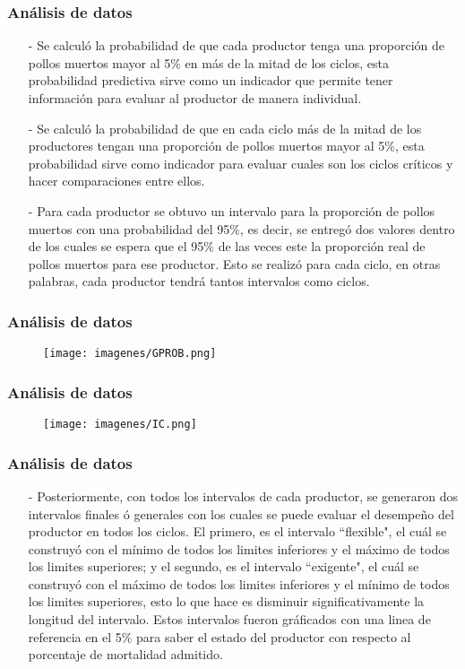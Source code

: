 \documentclass[11pt]{beamer}
\begin{document}
\begin{frame}
\frametitle{Análisis de datos}
\begin{itemize}
\justifying
\item[-]Se calculó la probabilidad de que cada productor tenga una proporción de pollos muertos mayor al 5\% en más de la mitad de los ciclos, esta probabilidad predictiva sirve como un indicador que permite tener información para evaluar al productor de manera individual.
\item[-]Se calculó la probabilidad de que en cada ciclo más de la mitad de los productores tengan una proporción de pollos muertos mayor al 5\%, esta probabilidad sirve como indicador para evaluar cuales son los ciclos críticos y hacer comparaciones entre ellos.
\item[-]Para cada productor se obtuvo un intervalo para la proporción de pollos muertos con una probabilidad del 95\%, es decir, se entregó dos valores dentro de los cuales se espera que el 95\% de las veces este la proporción real de pollos muertos para ese productor. Esto se realizó para cada ciclo, en otras palabras, cada productor tendrá tantos intervalos como ciclos.
\end{itemize}
\end{frame}

\begin{frame}
\frametitle{Análisis de datos}
\begin{figure}[!h]
        \texttt{[image: imagenes/GPROB.png]}
        \label{figura1}
\end{figure}
\end{frame}

\begin{frame}
\frametitle{Análisis de datos}
\begin{figure}[!h]
        \texttt{[image: imagenes/IC.png]}
        \label{figura1}
\end{figure}
\end{frame}

\begin{frame}
\frametitle{Análisis de datos}
\begin{itemize}
\justifying
\item[-]Posteriormente, con todos los intervalos de cada productor, se generaron dos intervalos finales ó generales con los cuales se puede evaluar el desempeño del productor en todos los ciclos. El primero, es el intervalo ``flexible", el cuál se construyó con el mínimo de todos los limites inferiores y el máximo de todos los limites superiores; y el segundo, es el intervalo ``exigente", el cuál se construyó con el máximo de todos los limites inferiores y el mínimo de todos los limites superiores, esto lo que hace es disminuir significativamente la longitud del intervalo. Estos intervalos fueron gráficados con una linea de referencia en el 5\% para saber el estado del productor con respecto al porcentaje de mortalidad admitido.
\end{itemize}
\end{frame}
\end{document}
